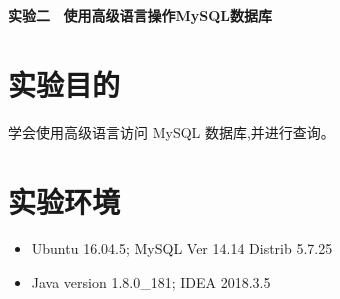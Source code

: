 \documentclass{ML}
\begin{document}
\maketitle

\newpage

\begin{center}
    \textbf{ 实验二 \ 使用高级语言操作MySQL数据库}
\end{center}
\section{实验目的}
学会使用高级语言访问 MySQL 数据库,并进行查询。
\section{实验环境}
\begin{itemize}
    \item Ubuntu 16.04.5; MySQL Ver 14.14 Distrib 5.7.25
    \item Java version 1.8.0\_181; IDEA 2018.3.5
\end{itemize}
\end{document}
